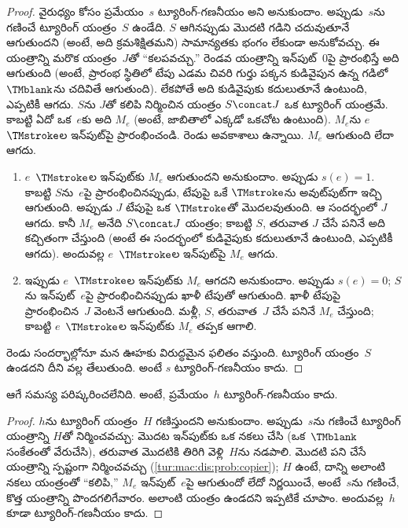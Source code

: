 \documentclass[../../../include/open-logic-section]{subfiles}
\begin{document}
\begin{proof}
వైరుధ్యం కోసం ప్రమేయం~$s$ ట్యూరింగ్-గణనీయం అని అనుకుందాం. అప్పుడు~$s$ను
గణించే ట్యూరింగ్ యంత్రం~$S$ ఉండేది. $S$ ఆగినప్పుడు మొదటి గడిని చదువుతూనే
ఆగుతుందని (అంటే, అది క్రమశిక్షితమని) సామాన్యతకు భంగం లేకుండా అనుకోవచ్చు.
ఈ యంత్రాన్ని మరొక యంత్రం~$J$తో ``కలపవచ్చు.'' రెండవ యంత్రాన్ని ఇన్‌పుట్~$0$పై
ప్రారంభిస్తే అది ఆగుతుంది (అంటే, ప్రారంభ స్థితిలో టేపు ఎడమ చివరి గుర్తు
పక్కన కుడివైపున ఉన్న గడిలో $\TMblank$ను చదివితే ఆగుతుంది). లేకపోతే అది
కుడివైపుకు కదులుతూనే ఉంటుంది, ఎప్పటికీ ఆగదు. $S$ను $J$తో కలిపి నిర్మించిన
యంత్రం $S \concat J$ ఒక ట్యూరింగ్ యంత్రమే. కాబట్టి ఏదో ఒక~$e$కు అది $M_e$
(అంటే, జాబితాలో ఎక్కడో ఒకచోట ఉంటుంది). $M_e$ను $e$~$\TMstroke$ల
ఇన్‌పుట్‌పై ప్రారంభించండి. రెండు అవకాశాలు ఉన్నాయి. $M_e$ ఆగుతుంది లేదా ఆగదు.
\begin{enumerate}
\item $e$~$\TMstroke$ల ఇన్‌పుట్‌కు $M_e$ ఆగుతుందని అనుకుందాం. అప్పుడు
  $s(e) = 1$. కాబట్టి $S$ను~$e$పై ప్రారంభించినప్పుడు, టేపుపై ఒకే
  $\TMstroke$ను అవుట్‌పుట్‌గా ఇచ్చి ఆగుతుంది. అప్పుడు $J$ టేపుపై ఒక
  $\TMstroke$తో మొదలవుతుంది. ఆ సందర్భంలో $J$ ఆగదు. కానీ $M_e$ అనేది
  $S \concat J$ యంత్రం; కాబట్టి $S$, తరువాత $J$ చేసే పనినే అది కచ్చితంగా
  చేస్తుంది (అంటే ఈ సందర్భంలో కుడివైపుకు కదులుతూనే ఉంటుంది, ఎప్పటికీ ఆగదు).
  అందువల్ల $e$~$\TMstroke$ల ఇన్‌పుట్‌పై $M_e$ ఆగదు.

\item ఇప్పుడు $e$~$\TMstroke$ల ఇన్‌పుట్‌కు $M_e$ ఆగదని అనుకుందాం.
  అప్పుడు $s(e) = 0$; $S$ను ఇన్‌పుట్~$e$పై ప్రారంభించినప్పుడు ఖాళీ టేపుతో
  ఆగుతుంది. ఖాళీ టేపుపై ప్రారంభించిన~$J$ వెంటనే ఆగుతుంది. మళ్లీ, $S$,
  తరువాత~$J$ చేసే పనినే $M_e$ చేస్తుంది; కాబట్టి $e$~$\TMstroke$ల
  ఇన్‌పుట్‌కు $M_e$ తప్పక ఆగాలి.
\end{enumerate}
రెండు సందర్భాల్లోనూ మన ఊహకు విరుద్ధమైన ఫలితం వస్తుంది. ట్యూరింగ్ యంత్రం~$S$
ఉండదని దీని వల్ల తేలుతుంది. అంటే $s$ ట్యూరింగ్-గణనీయం కాదు.
\end{proof}

\begin{thm}[ఆగే సమస్యను పరిష్కరించలేం]
 ఆగే సమస్య పరిష్కరించలేనిది. అంటే, ప్రమేయం~$h$
ట్యూరింగ్-గణనీయం కాదు.
\end{thm}

\begin{proof}
$h$ను ట్యూరింగ్ యంత్రం~$H$ గణిస్తుందని అనుకుందాం. అప్పుడు~$s$ను గణించే
ట్యూరింగ్ యంత్రాన్ని $H$తో నిర్మించవచ్చు: మొదట ఇన్‌పుట్‌కు ఒక నకలు చేసి
(ఒక~$\TMblank$ సంకేతంతో వేరుచేసి), తరువాత మొదటికి తిరిగి వెళ్లి~$H$ను
నడపాలి. మొదటి పని చేసే యంత్రాన్ని స్పష్టంగా నిర్మించవచ్చు
(\cref{tur:mac:dis:prob:copier}); $H$ ఉంటే, దాన్ని అలాంటి నకలు యంత్రంతో
``కలిపి,'' $M_e$ ఇన్‌పుట్~$e$పై ఆగుతుందో లేదో నిర్ణయించే, అంటే~$s$ను గణించే,
కొత్త యంత్రాన్ని పొందగలిగేవారం. అలాంటి యంత్రం ఉండదని ఇప్పటికే చూపాం.
అందువల్ల~$h$ కూడా ట్యూరింగ్-గణనీయం కాదు.
\end{proof}
\end{document}
